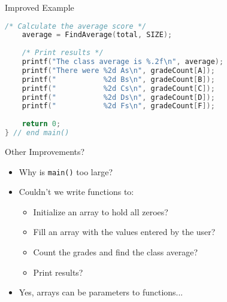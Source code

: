 \documentclass[graphics]{beamer}
\begin{document}
\begin{frame}[fragile]{Improved Example}
    \begin{lstlisting}[language=C,basicstyle=\footnotesize,keywordstyle=\color{blue},commentstyle=\color{green},showstringspaces=false,stringstyle=\color{red}]
    /* Calculate the average score */
    average = FindAverage(total, SIZE);
    
    /* Print results */
    printf("The class average is %.2f\n", average);
    printf("There were %2d As\n", gradeCount[A]);
    printf("           %2d Bs\n", gradeCount[B]);
    printf("           %2d Cs\n", gradeCount[C]);
    printf("           %2d Ds\n", gradeCount[D]);
    printf("           %2d Fs\n", gradeCount[F]);
    
    return 0;
} // end main()
    \end{lstlisting}
\end{frame}

\begin{frame}{Other Improvements?}
    \begin{itemize}
        \item Why is \texttt{main()} too large?
        \item Couldn't we write functions to:
        \begin{itemize}
            \item Initialize an array to hold all zeroes?
            \item Fill an array with the values entered by the user?
            \item Count the grades and find the class average?
            \item Print results?
        \end{itemize}
        \item Yes, arrays can be parameters to functions...
    \end{itemize}
\end{frame}
\end{document}
